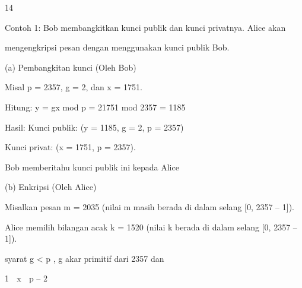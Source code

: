 \documentclass{article}
\begin{document}

14

Contoh 1:  Bob membangkitkan kunci publik dan kunci privatnya. Alice  akan 

mengengkripsi  pesan dengan menggunakan kunci publik Bob.

(a) Pembangkitan kunci (Oleh Bob)


Misal p = 2357, g = 2,  dan x = 1751.


Hitung: y = gx mod p = 21751 mod 2357 = 1185


Hasil:   Kunci publik: (y = 1185, g = 2, p = 2357) 



       Kunci privat: (x = 1751, p = 2357).

      Bob memberitahu kunci publik ini kepada Alice

(b) Enkripsi (Oleh Alice)


Misalkan pesan m = 2035 (nilai m masih berada di dalam selang [0, 2357 – 1]).


Alice memilih bilangan acak k = 1520  (nilai k berada di dalam selang [0, 2357 – 1]). 

syarat g < p , g akar primitif dari 2357 dan 

1  x  p – 2
\end{document}
